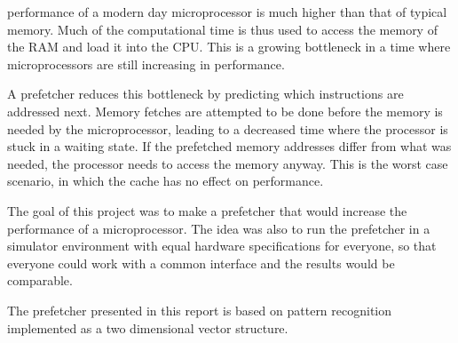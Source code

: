  performance of a modern day microprocessor is much higher than that of typical memory. Much of the computational time is thus used to access the memory of the RAM and load it into the CPU. This is a growing bottleneck in a time where microprocessors are still increasing in performance. 

A prefetcher reduces this bottleneck by predicting which instructions are addressed next. Memory fetches are attempted to be done before the memory is needed by the microprocessor, leading to a decreased time where the processor is stuck in a waiting state. If the prefetched memory addresses differ from what was needed, the processor needs to access the memory anyway. This is the worst case scenario, in which the cache has no effect on performance.

The goal of this project was to make a prefetcher that would increase the performance of a microprocessor. The idea was also to run the prefetcher in a simulator environment with equal hardware specifications for everyone, so that everyone could work with a common interface and the results would be comparable. 

The prefetcher presented in this report is based on pattern recognition implemented as a two dimensional vector structure.
